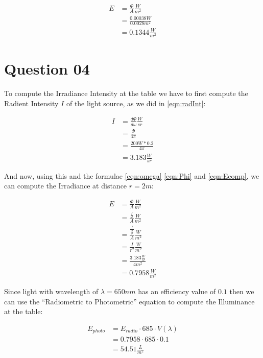     \begin{align}\label{eqn:Ecomp}
      E &= \frac{\Phi}{A}\frac{W}{m^2} \\
        &= \frac{0.00038W}{0.0028m^2} \\
        &= 0.1344\frac{W}{m^2}
    \end{align}

  \section{Question 04}

    To compute the Irradiance Intensity at the table we have to first compute the Radient Intensity $I$ of the light source, as
    we did in \ref{eqn:radInt}:

    \begin{align}
      I &= \frac{d\Phi}{d\omega}\frac{W}{sr} \\
        &= \frac{\Phi}{4\pi} \\
        &= \frac{200W * 0.2}{4\pi} \\
        &= 3.183 \frac{W}{sr}
    \end{align}

    And now, using this and the formulae \ref{eqn:omega} \ref{eqn:Phi} and \ref{eqn:Ecomp}, we can compute the Irradiance at distance
    $r = 2m$:

    \begin{align}\label{eqn:Ered}
      E &= \frac{\Phi}{A}\frac{W}{m^2}  \\
        &= \frac{\frac{I}{\omega}}{A}\frac{W}{m^2}  \\
        &= \frac{\frac{I}{\frac{A}{r^2}}}{A}\frac{W}{m^2}  \\
        &= \frac{I}{r^2}\frac{W}{m^2}  \\
        &= \frac{3.183\frac{W}{sr}}{4m^2} \\
        &= 0.7958\frac{W}{m^2}
    \end{align}

    Since light with wavelength of $\lambda = 650nm$ has an efficiency value of $0.1$ then we can use the ``Radiometric to Photometric'' equation
    to compute the Illuminance at the table:

    \begin{align}
      E_{photo} &= E_{radio} \cdot 685 \cdot V(\lambda) \\
                &= 0.7958 \cdot 685 \cdot 0.1 \\
                &= 54.51\frac{L}{m^2}
    \end{align}

